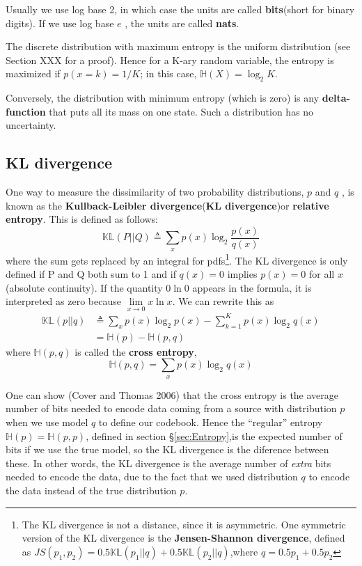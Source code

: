 Usually we use log base 2, in which case the units are called \textbf{bits}(short for binary digits). If we use log base $e$ , the units are called \textbf{nats}. 

The discrete distribution with maximum entropy is the uniform distribution (see Section XXX for a proof). Hence for a K-ary random variable, the entropy is maximized if $p(x = k)=1/K$; in this case, $\mathbb{H}(X)=\log_2K$. 

Conversely, the distribution with minimum entropy (which is zero) is any \textbf{delta-function} that puts all its mass on one state. Such a distribution has no uncertainty.


\subsection{KL divergence}
One way to measure the dissimilarity of two probability distributions, $p$ and $q$ , is known as the \textbf{Kullback-Leibler divergence}(\textbf{KL divergence})or \textbf{relative entropy}. This is defined as follows:
\begin{equation}
\mathbb{KL}(P||Q) \triangleq 
\sum\limits_{x}{p(x)\log_2\dfrac{p(x)}{q(x)}}
\end{equation}
where the sum gets replaced by an integral for pdfs\footnote{The KL divergence is not a distance, since it is asymmetric. One symmetric version of the KL divergence is the \textbf{Jensen-Shannon divergence}, defined as $JS(p_1,p_2)=0.5\mathbb{KL}(p_1||q)+0.5\mathbb{KL}(p_2||q)$,where $q=0.5p_1+0.5p_2$}. The KL divergence is only defined if P and Q both sum to 1 and if $q(x)=0$ implies $p(x)=0$ for all $x$(absolute continuity). If the quantity  $0\ln0$ appears in the formula, it is interpreted as zero because $\lim\limits_{x \to 0}x\ln x$. We can rewrite this as
\begin{equation}\begin{split}
\mathbb{KL}(p||q) & \triangleq \sum\limits_{x}{p(x)\log_2p(x)}-\sum\limits_{k=1}^{K}{p(x)\log_2q(x)} \\
    & =\mathbb{H}(p)-\mathbb{H}(p,q)
\end{split}\end{equation}
where $\mathbb{H}(p,q)$ is called the \textbf{cross entropy},
\begin{equation}\label{eqn:cross-entropy}
\mathbb{H}(p,q)=\sum\limits_{x}{p(x)\log_2q(x)}
\end{equation}

One can show (Cover and Thomas 2006) that the cross entropy is the average number of bits needed to encode data coming from a source with distribution $p$ when we use model $q$ to define our codebook. Hence the “regular” entropy $\mathbb{H}(p)=\mathbb{H}(p,p)$, defined in section \S \ref{sec:Entropy},is the expected number of bits if we use the true model, so the KL divergence is the diference between these. In other words, the KL divergence is the average number of \emph{extra} bits needed to encode the data, due to the fact that we used distribution $q$ to encode the data instead of the true distribution $p$.

